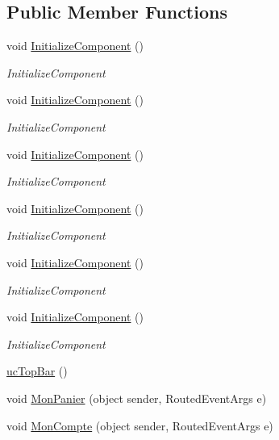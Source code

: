 \subsection*{Public Member Functions}
\begin{DoxyCompactItemize}
\item 
void \hyperlink{classnewPizza1_1_1ucTopBar_a667aed93b177538819f27c62e5e88844}{Initialize\+Component} ()
\begin{DoxyCompactList}\small\item\em Initialize\+Component \end{DoxyCompactList}\item 
void \hyperlink{classnewPizza1_1_1ucTopBar_a667aed93b177538819f27c62e5e88844}{Initialize\+Component} ()
\begin{DoxyCompactList}\small\item\em Initialize\+Component \end{DoxyCompactList}\item 
void \hyperlink{classnewPizza1_1_1ucTopBar_a667aed93b177538819f27c62e5e88844}{Initialize\+Component} ()
\begin{DoxyCompactList}\small\item\em Initialize\+Component \end{DoxyCompactList}\item 
void \hyperlink{classnewPizza1_1_1ucTopBar_a667aed93b177538819f27c62e5e88844}{Initialize\+Component} ()
\begin{DoxyCompactList}\small\item\em Initialize\+Component \end{DoxyCompactList}\item 
void \hyperlink{classnewPizza1_1_1ucTopBar_a667aed93b177538819f27c62e5e88844}{Initialize\+Component} ()
\begin{DoxyCompactList}\small\item\em Initialize\+Component \end{DoxyCompactList}\item 
void \hyperlink{classnewPizza1_1_1ucTopBar_a667aed93b177538819f27c62e5e88844}{Initialize\+Component} ()
\begin{DoxyCompactList}\small\item\em Initialize\+Component \end{DoxyCompactList}\item 
\hyperlink{classnewPizza1_1_1ucTopBar_a0b2a65964f1a91430b27927fac8568b8}{uc\+Top\+Bar} ()
\item 
void \hyperlink{classnewPizza1_1_1ucTopBar_aadaac61e856989e2d021405a3265ee63}{Mon\+Panier} (object sender, Routed\+Event\+Args e)
\item 
void \hyperlink{classnewPizza1_1_1ucTopBar_ada4587551ec61f2e8901f56ad05d8d84}{Mon\+Compte} (object sender, Routed\+Event\+Args e)
\end{DoxyCompactItemize}
